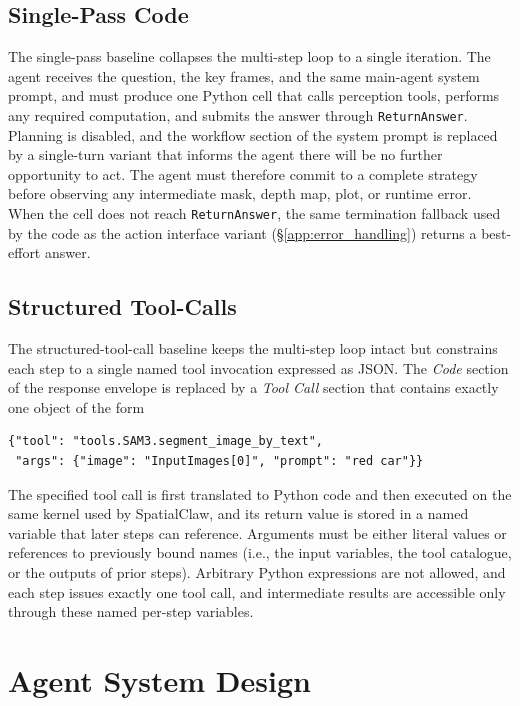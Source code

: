 \documentclass{llmxive}
\providecommand{\ours}{SpatialClaw}
\begin{document}
\subsection{Single-Pass Code}
\label{app:baseline_single_pass}
The single-pass baseline collapses the multi-step loop to a single iteration. The agent receives the question, the key frames, and the same main-agent system prompt, and must produce one Python cell that calls perception tools, performs any required computation, and submits the answer through \texttt{ReturnAnswer}. Planning is disabled, and the workflow section of the system prompt is replaced by a single-turn variant that informs the agent there will be no further opportunity to act. The agent must therefore commit to a complete strategy before observing any intermediate mask, depth map, plot, or runtime error. When the cell does not reach \texttt{ReturnAnswer}, the same termination fallback used by the code as the action interface variant (\S\ref{app:error_handling}) returns a best-effort answer.

\subsection{Structured Tool-Calls}
\label{app:baseline_react}
The structured-tool-call baseline keeps the multi-step loop intact but constrains each step to a single named tool invocation expressed as JSON. The \emph{Code} section of the response envelope is replaced by a \emph{Tool Call} section that contains exactly one object of the form
\begin{lstlisting}[style=promptStyle]
{"tool": "tools.SAM3.segment_image_by_text",
 "args": {"image": "InputImages[0]", "prompt": "red car"}}
\end{lstlisting}
The specified tool call is first translated to Python code and then executed on the same kernel used by \ours{}, and its return value is stored in a named variable that later steps can reference. Arguments must be either literal values or references to previously bound names (i.e., the input variables, the tool catalogue, or the outputs of prior steps).
Arbitrary Python expressions are not allowed, and each step issues exactly one tool call, and intermediate results are accessible only through these named per-step variables.


\section{Agent System Design}
\label{app:system}
\end{document}

